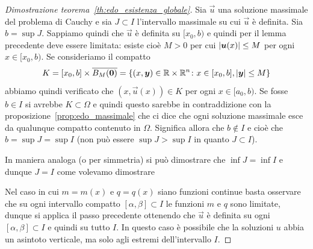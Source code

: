 \begin{proof}[Dimostrazione teorema~\ref{th:edo_esistenza_globale}]
Sia $\vec u$ una soluzione massimale del problema di Cauchy e sia
$J\subset I$ l'intervallo massimale su cui $\vec u$ è definita.
Sia $b=\sup J$. Sappiamo quindi che $\vec u$ è definita su $[x_0,b)$
e quindi per il lemma precedente deve essere limitata: esiste cioè
$M>0$ per cui ${\left|\boldsymbol u(x)\right|}\le M$ per ogni $x\in[x_0,b)$.
Se consideriamo il compatto
\[
K=[x_0,b] \times \overline{B_M(\boldsymbol 0)}
 = {\left\{ (x,\boldsymbol y)\in {\mathbb R} \times {\mathbb R}^n\colon x\in [x_0,b], {\left|\boldsymbol y\right|}\le M \right\}}
\]
abbiamo quindi verificato che $(x,\vec u(x))\in K$ per ogni $x\in [a_0,b)$.
Se fosse $b\in I$ si avrebbe $K\subset \Omega$ e quindi questo sarebbe
in contraddizione con la proposizione~\ref{prop:edo_massimale} che
ci dice che ogni soluzione massimale esce da qualunque compatto contenuto
in $\Omega$. Significa allora che $b\not \in I$ e cioè che $b = \sup J = \sup I$
(non può essere $\sup J>\sup I$ in quanto $J\subset I$).

In maniera analoga (o per simmetria) si può dimostrare che $\inf J=\inf I$
e dunque $J=I$ come volevamo dimostrare

Nel caso in cui $m=m(x)$ e $q=q(x)$ siano funzioni continue basta 
osservare che su ogni intervallo compatto $[\alpha,\beta]\subset I$ 
le funzioni $m$ e $q$ sono limitate, dunque si applica il passo precedente 
ottenendo che $\vec u$ è definita su ogni $[\alpha,\beta]\subset I$ e quindi su tutto $I$.
In questo caso è possibile che la soluzioni $u$ abbia un asintoto 
verticale, ma solo agli estremi dell'intervallo $I$.
\end{proof}

